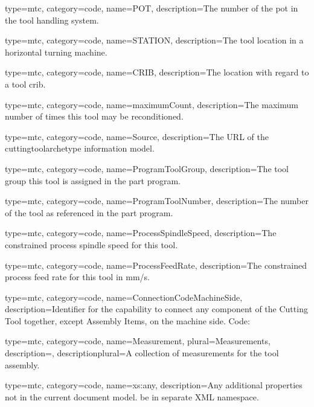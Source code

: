 {
  type=mtc,
  category=code,
  name={POT},
  description={The number of the pot in the tool handling system.}
}


{
  type=mtc,
  category=code,
  name={STATION},
  description={The tool location in a horizontal turning machine.}
}


{
  type=mtc,
  category=code,
  name={CRIB},
  description={The location with regard to a tool crib.}
}


{
  type=mtc,
  category=code,
  name={maximumCount},
  description={The maximum number of times this tool may be reconditioned.}
}


{
  type=mtc,
  category=code,
  name={Source},
  description={The URL of the \gls{cuttingtoolarchetype} \gls{information model}.}
}


{
  type=mtc,
  category=code,
  name={ProgramToolGroup},
  description={The tool group this tool is assigned in the part program.}
}


{
  type=mtc,
  category=code,
  name={ProgramToolNumber},
  description={The number of the tool as referenced in the part program.}
}


{
  type=mtc,
  category=code,
  name={ProcessSpindleSpeed},
  description={The constrained process spindle speed for this tool.}
}


{
  type=mtc,
  category=code,
  name={ProcessFeedRate},
  description={The constrained process feed rate for this tool in mm/s.}
}


{
  type=mtc,
  category=code,
  name={ConnectionCodeMachineSide},
  description={Identifier for the capability to connect any component of the Cutting Tool together, except Assembly Items, on the machine side. Code: }
}


{
  type=mtc,
  category=code,
  name={Measurement},
  plural={Measurements},
  description={},
  descriptionplural={A collection of measurements for the tool assembly.}
}


{
  type=mtc,
  category=code,
  name={xs:any},
  description={Any additional properties not in the current document model. \MUST be in separate XML namespace.}
}


